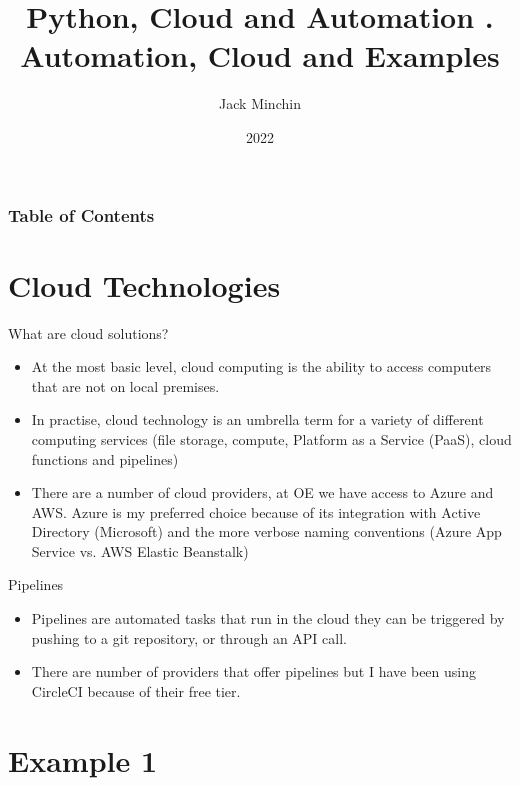 \documentclass[aspectratio=169]{beamer}
\title{\large{\textbf{Python, Cloud and Automation}} \newline\newline 3. Automation, Cloud and Examples}
\author{Jack Minchin}
\institute{Tourism Economics}
\date{2022}
\begin{document}
\frame{\titlepage}

\begin{frame}
\frametitle{Table of Contents}
\tableofcontents
\end{frame}


\section{Cloud Technologies}

\begin{frame}{What are cloud solutions?}

\begin{itemize}
	\item At the most basic level, cloud computing is the ability to access computers that are not on local premises. 
	\item In practise, cloud technology is an umbrella term for a variety of different computing services (file storage, compute, Platform as a Service (PaaS), cloud functions and pipelines)
	\item There are a number of cloud providers, at OE we have access to Azure and AWS. Azure is my preferred choice because of its integration with Active Directory (Microsoft) and the more verbose naming conventions (Azure App Service vs. AWS Elastic Beanstalk)
\end{itemize}

\end{frame}

\begin{frame}{Pipelines}

\begin{itemize}
	\item Pipelines are automated tasks that run in the cloud they can be triggered by pushing to a git repository, or through an API call.
	\item There are number of providers that offer pipelines but I have been using CircleCI because of their free tier. 
\end{itemize}
\end{frame}

\section{Example 1}
\end{document}
